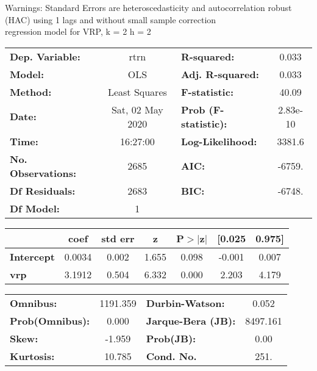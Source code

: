 Warnings: \newline
 [1] Standard Errors are heteroscedasticity and autocorrelation robust (HAC) using 1 lags and without small sample correction\\ 

regression model for VRP, k = 2 h = 2\begin{center}
\begin{tabular}{lclc}
\toprule
\textbf{Dep. Variable:}    &       rtrn       & \textbf{  R-squared:         } &     0.033   \\
\textbf{Model:}            &       OLS        & \textbf{  Adj. R-squared:    } &     0.033   \\
\textbf{Method:}           &  Least Squares   & \textbf{  F-statistic:       } &     40.09   \\
\textbf{Date:}             & Sat, 02 May 2020 & \textbf{  Prob (F-statistic):} &  2.83e-10   \\
\textbf{Time:}             &     16:27:00     & \textbf{  Log-Likelihood:    } &    3381.6   \\
\textbf{No. Observations:} &        2685      & \textbf{  AIC:               } &    -6759.   \\
\textbf{Df Residuals:}     &        2683      & \textbf{  BIC:               } &    -6748.   \\
\textbf{Df Model:}         &           1      & \textbf{                     } &             \\
\bottomrule
\end{tabular}
\begin{tabular}{lcccccc}
                   & \textbf{coef} & \textbf{std err} & \textbf{z} & \textbf{P$> |$z$|$} & \textbf{[0.025} & \textbf{0.975]}  \\
\midrule
\textbf{Intercept} &       0.0034  &        0.002     &     1.655  &         0.098        &       -0.001    &        0.007     \\
\textbf{vrp}       &       3.1912  &        0.504     &     6.332  &         0.000        &        2.203    &        4.179     \\
\bottomrule
\end{tabular}
\begin{tabular}{lclc}
\textbf{Omnibus:}       & 1191.359 & \textbf{  Durbin-Watson:     } &    0.052  \\
\textbf{Prob(Omnibus):} &   0.000  & \textbf{  Jarque-Bera (JB):  } & 8497.161  \\
\textbf{Skew:}          &  -1.959  & \textbf{  Prob(JB):          } &     0.00  \\
\textbf{Kurtosis:}      &  10.785  & \textbf{  Cond. No.          } &     251.  \\
\bottomrule
\end{tabular}
\end{center}

